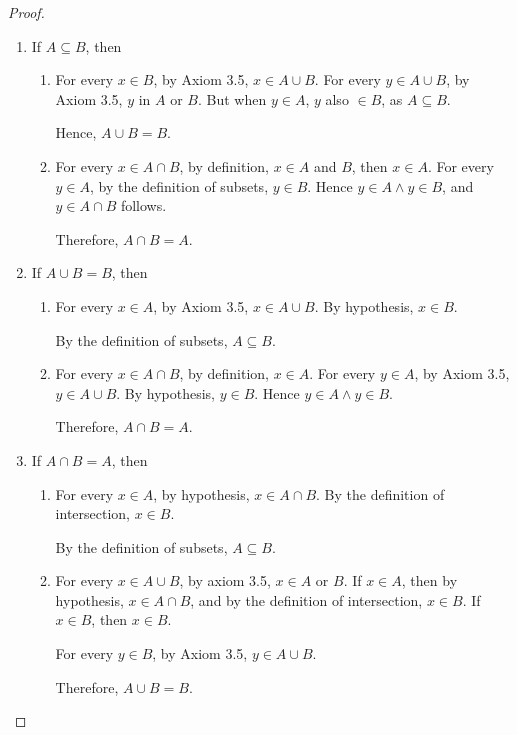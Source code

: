 \begin{proof}\leavevmode
	\begin{enumerate}
		\item If $A \subseteq B$, then
		\begin{enumerate}
			\item For every $x \in B$, by Axiom 3.5, $x \in A \cup B$. For every $y \in A \cup B$, by Axiom 3.5, $y$ in $A$ or $B$. But when $y \in A$, $y$ also $\in B$, as $A \subseteq B$. 
			
			Hence, $A \cup B = B$.
			\item For every $x \in A \cap B$, by definition, $x \in A$ and $B$, then $x \in A$. For every $y \in A$, by the definition of subsets, $y \in B$. Hence $y \in A \wedge y \in B$, and $y \in A \cap B$ follows. 
			
			Therefore, $A \cap B = A$.
		\end{enumerate}
	
		\item If $A \cup B = B$, then
		\begin{enumerate}
			\item For every $x \in A$, by Axiom 3.5, $x \in A \cup B$. By hypothesis, $x \in B$. 
			
			By the definition of subsets, $A \subseteq B$.
			
			\item For every $x \in A \cap B$, by definition, $x \in A$. For every $y \in A$, by Axiom 3.5, $y \in A \cup B$. By hypothesis, $y \in B$. Hence $y \in A \wedge y \in B$.
			
			Therefore, $A \cap B = A$.
		\end{enumerate}
	
		\item If $A \cap B = A$, then
		\begin{enumerate}
			\item For every $x \in A$, by hypothesis, $x \in A \cap B$. By the definition of intersection, $x \in B$. 
			
			By the definition of subsets, $A \subseteq B$.
			
			\item For every $x \in A \cup B$, by axiom 3.5, $x \in A$ or $B$. If $x \in A$, then by hypothesis, $x \in A \cap B$, and by the definition of intersection, $x \in B$. If $x \in B$, then $x \in B$.
			
			For every $y \in B$, by Axiom 3.5, $y \in A \cup B$.
			
			Therefore, $A \cup B = B$.
		\end{enumerate}
	\end{enumerate}
\end{proof}

